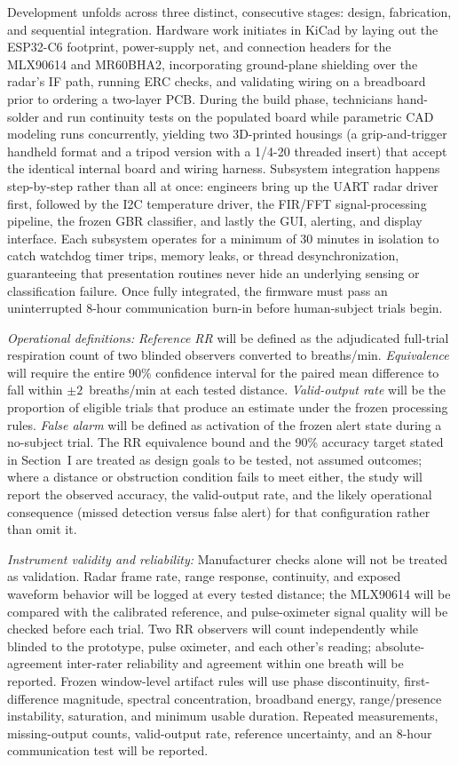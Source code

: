 \documentclass[10pt,conference]{IEEEtran}
\begin{document}
Development unfolds across three distinct, consecutive stages: design, fabrication, and sequential integration. Hardware work initiates in KiCad by laying out the ESP32-C6 footprint, power-supply net, and connection headers for the MLX90614 and MR60BHA2, incorporating ground-plane shielding over the radar's IF path, running ERC checks, and validating wiring on a breadboard prior to ordering a two-layer PCB. During the build phase, technicians hand-solder and run continuity tests on the populated board while parametric CAD modeling runs concurrently, yielding two 3D-printed housings (a grip-and-trigger handheld format and a tripod version with a 1/4-20 threaded insert) that accept the identical internal board and wiring harness. Subsystem integration happens step-by-step rather than all at once: engineers bring up the UART radar driver first, followed by the I2C temperature driver, the FIR/FFT signal-processing pipeline, the frozen GBR classifier, and lastly the GUI, alerting, and display interface. Each subsystem operates for a minimum of 30 minutes in isolation to catch watchdog timer trips, memory leaks, or thread desynchronization, guaranteeing that presentation routines never hide an underlying sensing or classification failure. Once fully integrated, the firmware must pass an uninterrupted 8-hour communication burn-in before human-subject trials begin. 

\textit{Operational definitions:} \emph{Reference RR} will be defined as the adjudicated full-trial respiration count of two blinded observers converted to breaths/min. \emph{Equivalence} will require the entire 90\% confidence interval for the paired mean difference to fall within $\pm2$~breaths/min at each tested distance. \emph{Valid-output rate} will be the proportion of eligible trials that produce an estimate under the frozen processing rules. \emph{False alarm} will be defined as activation of the frozen alert state during a no-subject trial. The RR equivalence bound and the 90\% accuracy target stated in Section~I are treated as design goals to be tested, not assumed outcomes; where a distance or obstruction condition fails to meet either, the study will report the observed accuracy, the valid-output rate, and the likely operational consequence (missed detection versus false alert) for that configuration rather than omit it.

\textit{Instrument validity and reliability:} Manufacturer checks alone will not be treated as validation. Radar frame rate, range response, continuity, and exposed waveform behavior will be logged at every tested distance; the MLX90614 will be compared with the calibrated reference, and pulse-oximeter signal quality will be checked before each trial. Two RR observers will count independently while blinded to the prototype, pulse oximeter, and each other's reading; absolute-agreement inter-rater reliability and agreement within one breath will be reported. Frozen window-level artifact rules will use phase discontinuity, first-difference magnitude, spectral concentration, broadband energy, range/presence instability, saturation, and minimum usable duration. Repeated measurements, missing-output counts, valid-output rate, reference uncertainty, and an 8-hour communication test will be reported.
\end{document}
